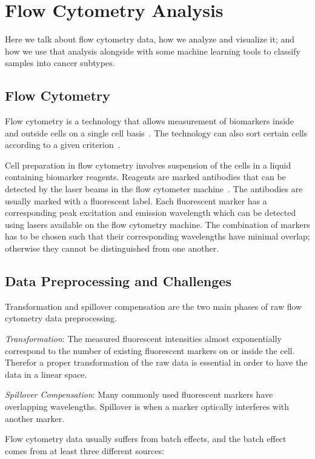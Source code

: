 \chapter{Flow Cytometry Analysis}

Here we talk about flow cytometry data, how we analyze and visualize it; and how we use that analysis alongside with some machine learning tools to classify samples into cancer subtypes.

\section{Flow Cytometry}
Flow cytometry is a technology that allows measurement of biomarkers inside and outside cells on a single cell basis~\cite{flow-cytometry}. The technology can also sort certain cells according to a given criterion~\cite{flow-cytometry-sorting}.

Cell preparation in flow cytometry involves suspension of the cells in a liquid containing biomarker reagents. Reagents are marked antibodies that can be detected by the laser beams in the flow cytometer machine~\cite{flow-cytometry-cell-preparation}. The antibodies are usually marked with a fluorescent label. Each fluorescent marker has a corresponding peak excitation and emission wavelength which can be detected using lasers available on the flow cytometry machine. The combination of markers has to be chosen such that their corresponding wavelengths have minimal overlap; otherwise they cannot be distinguished from one another.



\section{Data Preprocessing and Challenges}
Transformation and spillover compensation are the two main phases of raw flow cytometry data preprocessing.

\emph{Transformation}: The measured fluorescent intensities almost exponentially correspond to the number of existing fluorescent markers on or inside the cell. Therefor a proper transformation of the raw data is essential in order to have the data in a linear space.

\emph{Spillover Compensation}: Many commonly used fluorescent markers have overlapping wavelengths. Spillover is when a marker optically interferes with another marker.

Flow cytometry data usually suffers from batch effects, and the batch effect comes from at least three different sources:

